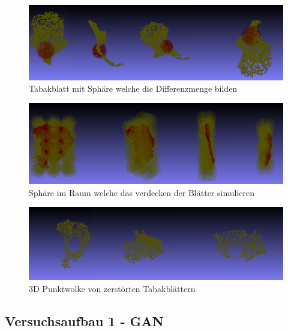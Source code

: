 \documentclass{llncs}
\begin{document}
\begin{figure}[htbp] 
	\centering
	\includegraphics[width=1.0\textwidth]{sphere1.png}
	\caption{Tabakblatt mit Sphäre welche die Differenzmenge bilden}
	\label{fig:Bild52}
\end{figure}

\begin{figure}[htbp] 
	\centering
	\includegraphics[width=1.0\textwidth]{allsphere.png}
	\caption{Sphäre im Raum welche das verdecken der Blätter simulieren}
	\label{fig:Bild53}
\end{figure}

\begin{figure}[htbp] 
	\centering
	\includegraphics[width=1.0\textwidth]{training_destroyed.png}
	\caption{3D Punktwolke von zerstörten Tabakblättern}
	\label{fig:Bild54}
\end{figure}
\newpage


\subsection{Versuchsaufbau 1 - GAN}\label{sec:versuch1-aufbau}
\end{document}
